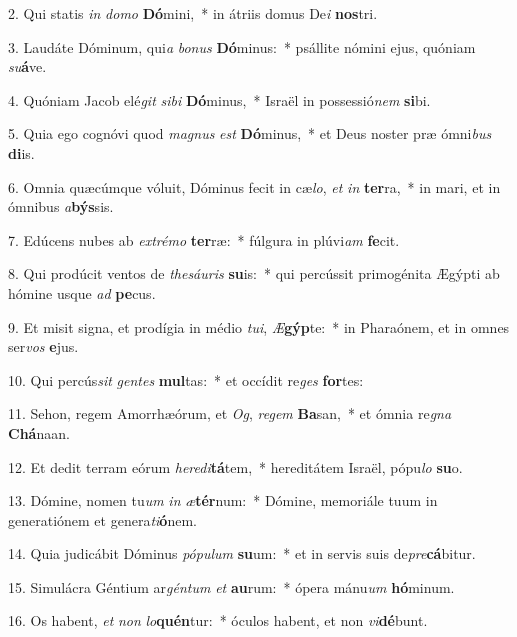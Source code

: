 2. Qui statis \textit{in} \textit{do}\textit{mo} \textbf{Dó}mini,~*  in átriis domus De\textit{i} \textbf{nos}tri.\

3. Laudáte Dóminum, qui\textit{a} \textit{bo}\textit{nus} \textbf{Dó}minus:~*  psállite nómini ejus, quóniam \textit{su}\textbf{á}ve.\

4. Quóniam Jacob elé\textit{git} \textit{si}\textit{bi} \textbf{Dó}minus,~*  Israël in possessió\textit{nem} \textbf{si}bi.\

5. Quia ego cognóvi quod \textit{ma}\textit{gnus} \textit{est} \textbf{Dó}minus,~*  et Deus noster præ ómni\textit{bus} \textbf{di}is.\

6. Omnia quæcúmque vóluit, Dóminus fecit in cæ\textit{lo}, \textit{et} \textit{in} \textbf{ter}ra,~*  in mari, et in ómnibus \textit{a}\textbf{býs}sis.\

7. Edúcens nubes ab \textit{ex}\textit{tré}\textit{mo} \textbf{ter}ræ:~*  fúlgura in plúvi\textit{am} \textbf{fe}cit.\

8. Qui prodúcit ventos de \textit{the}\textit{sáu}\textit{ris} \textbf{su}is:~*  qui percússit primogénita Ægýpti ab hómine usque \textit{ad} \textbf{pe}cus.\

9. Et misit signa, et prodígia in médio \textit{tu}\textit{i}, \textit{Æ}\textbf{gýp}te:~*  in Pharaónem, et in omnes ser\textit{vos} \textbf{e}jus.\

10. Qui percús\textit{sit} \textit{gen}\textit{tes} \textbf{mul}tas:~*  et occídit re\textit{ges} \textbf{for}tes:\

11. Sehon, regem Amorrhæórum, et \textit{Og}, \textit{re}\textit{gem} \textbf{Ba}san,~*  et ómnia re\textit{gna} \textbf{Chá}naan.\

12. Et dedit terram eórum \textit{he}\textit{re}\textit{di}\textbf{tá}tem,~*  hereditátem Israël, pópu\textit{lo} \textbf{su}o.\

13. Dómine, nomen tu\textit{um} \textit{in} \textit{æ}\textbf{tér}num:~*  Dómine, memoriále tuum in generatiónem et genera\textit{ti}\textbf{ó}nem.\

14. Quia judicábit Dóminus \textit{pó}\textit{pu}\textit{lum} \textbf{su}um:~*  et in servis suis de\textit{pre}\textbf{cá}bitur.\

15. Simulácra Géntium ar\textit{gén}\textit{tum} \textit{et} \textbf{au}rum:~*  ópera mánu\textit{um} \textbf{hó}minum.\

16. Os habent, \textit{et} \textit{non} \textit{lo}\textbf{quén}tur:~*  óculos habent, et non \textit{vi}\textbf{dé}bunt.\


